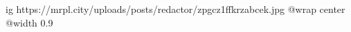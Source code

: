  
 
 
 
 

\ifcmt
  ig https://mrpl.city/uploads/posts/redactor/zpgcz1ffkrzabcek.jpg
  @wrap center
  @width 0.9
\fi
